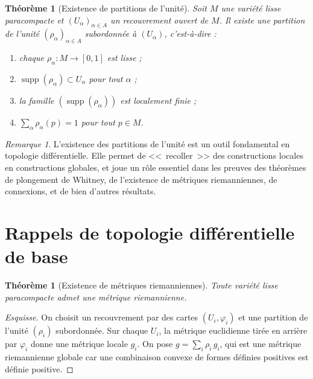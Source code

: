\documentclass[12pt,a4paper,openany]{book}
\theoremstyle{definition}
\theoremstyle{plain}
\newtheorem{theoreme}[definition]{Théorème}
\theoremstyle{remark}
\newtheorem{remarque}[definition]{Remarque}
\begin{document}
\begin{theoreme}[Existence de partitions de l'unité]\label{thm:app-partition}
Soit $M$ une variété lisse paracompacte et $(U_\alpha)_{\alpha \in A}$ un
recouvrement ouvert de $M$. Il existe une partition de l'unité
$(\rho_\alpha)_{\alpha \in A}$ subordonnée à $(U_\alpha)$, c'est-à-dire :
\begin{enumerate}[label=(\roman*)]
  \item chaque $\rho_\alpha : M \to [0,1]$ est lisse ;
  \item $\operatorname{supp}(\rho_\alpha) \subset U_\alpha$ pour tout $\alpha$ ;
  \item la famille $(\operatorname{supp}(\rho_\alpha))$ est localement finie ;
  \item $\sum_\alpha \rho_\alpha(p) = 1$ pour tout $p \in M$.
\end{enumerate}
\end{theoreme}

\begin{remarque}
L'existence des partitions de l'unité est un outil fondamental en topologie
différentielle. Elle permet de <<~recoller~>> des constructions locales en
constructions globales, et joue un rôle essentiel dans les preuves des théorèmes
de plongement de Whitney, de l'existence de métriques riemanniennes, de connexions,
et de bien d'autres résultats.
\end{remarque}

\section{Rappels de topologie différentielle de base}\label{app:rappels-diff}

\begin{theoreme}[Existence de métriques riemanniennes]\label{thm:app-metrique}
Toute variété lisse paracompacte admet une métrique riemannienne.
\end{theoreme}

\begin{proof}[Esquisse]
On choisit un recouvrement par des cartes $(U_i, \varphi_i)$ et une partition de
l'unité $(\rho_i)$ subordonnée. Sur chaque $U_i$, la métrique euclidienne
tirée en arrière par $\varphi_i$ donne une métrique locale $g_i$. On pose
$g = \sum_i \rho_i \, g_i$, qui est une métrique riemannienne globale car une
combinaison convexe de formes définies positives est définie positive.
\end{proof}
\end{document}
